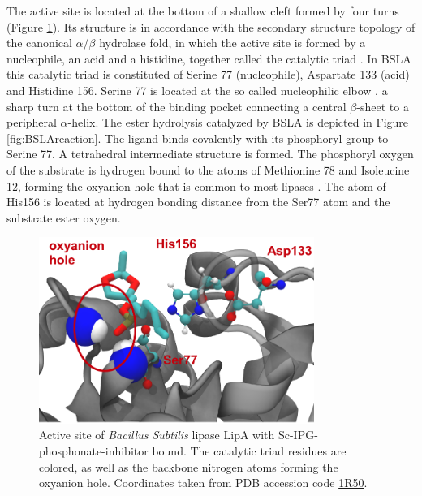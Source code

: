 \documentclass[english, a4paper, 12pt, titlepage, draft]{article}
\newcommand{\PDB}[1]{\href{http://pdb.rcsb.org/pdb/explore/explore.do?structureId=#1}{#1}}
\begin{document}
The active site is located at the bottom of a shallow cleft formed by four turns (Figure \ref{fig:BSLAactiveSite}).
Its structure is in accordance with the secondary structure topology of the canonical $\alpha$/$\beta$ hydrolase fold, in which the active site is formed by a nucleophile, an acid and a histidine, together called the catalytic triad \cite{BSLA_1I6W}.
In BSLA this catalytic triad is constituted of Serine 77 (nucleophile), Aspartate 133 (acid) and Histidine 156.
Serine 77 is located at the so called nucleophilic elbow \cite{nucleophileElbow}, a sharp turn at the bottom of the binding pocket connecting a central $\beta$-sheet to a peripheral $\alpha$-helix.
The ester hydrolysis catalyzed by BSLA is depicted in Figure \ref{fig:BSLAreaction}.
The ligand binds covalently with its phosphoryl group to Serine 77.
A tetrahedral intermediate structure is formed.
The phosphoryl oxygen of the substrate is hydrogen bound to the  atoms of Methionine 78 and Isoleucine 12, forming the oxyanion hole that is common to most lipases \cite{BSLA_1I6W}.
The  atom of His156 is located at hydrogen bonding distance from the Ser77  atom and the substrate ester oxygen.






\begin{figure}
    \centering
    \includegraphics[width=0.8\textwidth]{figures/BSLA_pocket/BSLA_pocket_cartoon.pdf}
    \caption{Active site of \textit{Bacillus Subtilis} lipase LipA with Sc-IPG-phosphonate-inhibitor bound.
    The catalytic triad residues are colored, as well as the backbone nitrogen atoms forming the oxyanion hole.
    Coordinates taken from PDB accession code \PDB{1R50}.}
    \label{fig:BSLAactiveSite}
\end{figure} 
\end{document}
